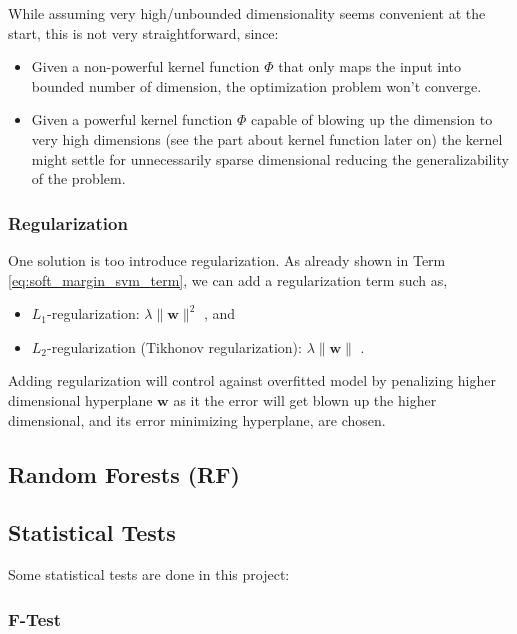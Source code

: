 \documentclass[pdftex,12pt,a4paper]{report}
\begin{document}
While assuming very high/unbounded dimensionality seems convenient at the start, this is not very straightforward, since:

\begin{itemize}
\item Given a non-powerful kernel function $\Phi$ that only maps the input into bounded number of dimension, the optimization problem won't converge.
\item Given a powerful kernel function $\Phi$ capable of blowing up the dimension to very high dimensions (see the part about kernel function later on) the kernel might settle for unnecessarily sparse dimensional reducing the generalizability of the problem.
\end{itemize}

\subsubsection*{Regularization}

One solution is too introduce regularization. As already shown in Term \ref{eq:soft_margin_svm_term}, we can add a regularization term such as, 

\begin{itemize}
\item $L_1$-regularization: $\lambda \| \mathbf{w} \|^2$ \cite{park2007l1}, and
\item $L_2$-regularization (Tikhonov regularization): $\lambda \| \mathbf{w} \|$ \cite{tikhonov1977solutions}.
\end{itemize}

Adding regularization will control against overfitted model by penalizing higher dimensional hyperplane $\mathbf{w}$ as it the error will get blown up the higher dimensional, and its error minimizing hyperplane, are chosen.

\subsection{Random Forests (RF)}
\label{subsection:rf}

\subsection{Statistical Tests}

Some statistical tests are done in this project:

\subsubsection{F-Test}
\end{document}

